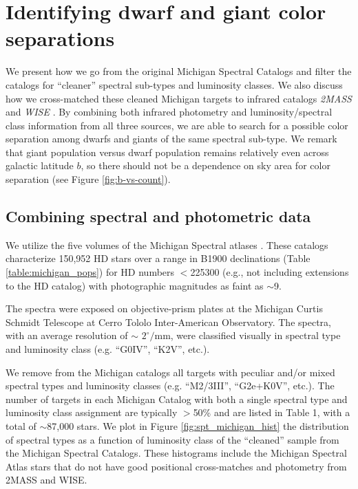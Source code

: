 \chapter{Identifying dwarf and giant color separations} \label{chap:2}


We present how we go from the original Michigan Spectral Catalogs \citep{Houk1975,Houk1978,Houk1982,Houk1988,Houk1999} and filter the catalogs for ``cleaner'' spectral sub-types and luminosity classes. We also discuss how we cross-matched these cleaned Michigan targets to infrared catalogs \textit{2MASS} and \textit{WISE} \citep{2MASS,ALLWISE}. By combining both infrared photometry and luminosity/spectral class information from all three sources, we are able to search for a possible color separation among dwarfs and giants of the same spectral sub-type. We remark that giant population versus dwarf population remains relatively even across galactic latitude $b$, so there should not be a dependence on sky area for color separation (see Figure \ref{fig:b-vs-count}).

\section{Combining spectral and photometric data} \label{sec:cross-matching}
We utilize the five volumes of the Michigan Spectral atlases \citep[]{Houk1975, Houk1978, Houk1982,Houk1988,Houk1999}. These catalogs characterize 150,952 HD stars over a range in B1900 declinations (Table \ref{table:michigan_pops}) for HD numbers $<$225300 (e.g., not including extensions to the HD catalog) with photographic magnitudes as faint as $\sim$9.

The spectra were exposed on objective-prism plates at the Michigan Curtis Schmidt Telescope at Cerro Tololo Inter-American Observatory. The spectra, with an average resolution of $\sim$ $2^\circ / $mm, were classified visually in spectral type and luminosity class (e.g. ``G0IV'', ``K2V'', etc.).  

We remove from the Michigan catalogs all targets with peculiar and/or mixed spectral types and luminosity classes (e.g. ``M2/3III'', ``G2e+K0V'', etc.).  The  number of targets in each Michigan Catalog with both a single spectral type and luminosity class assignment are typically $>$50\% and are listed in Table 1, with a total of $\sim$87,000 stars. We plot in Figure \ref{fig:spt_michigan_hist} the distribution of spectral types as a function of luminosity class of the ``cleaned'' sample from the Michigan Spectral Catalogs.  These histograms include the Michigan Spectral Atlas stars that do not have good positional cross-matches and photometry from 2MASS and WISE. 

